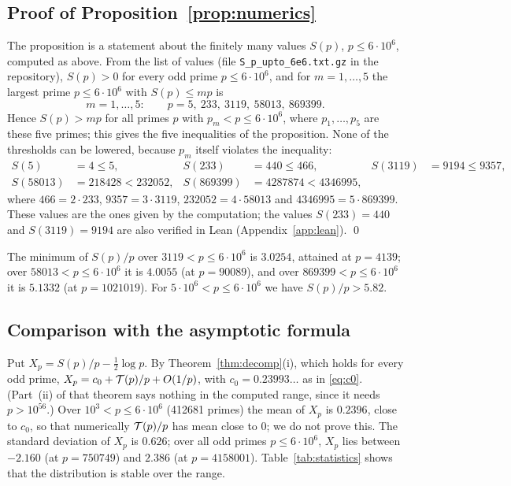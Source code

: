\subsection{Proof of Proposition~\ref{prop:numerics}}
The proposition is a statement about the finitely many values $S(p)$, $p\le6\cdot10^6$, computed as above. From the list of values (file \texttt{S\_p\_upto\_6e6.txt.gz} in the repository), $S(p)>0$ for every odd prime $p\le6\cdot10^6$, and for $m=1,\dots,5$ the largest prime $p\le6\cdot10^6$ with $S(p)\le mp$ is
\[
m=1,\dots,5:\qquad p=5,\ 233,\ 3119,\ 58013,\ 869399 .
\]
Hence $S(p)>mp$ for all primes $p$ with $p_m<p\le6\cdot10^6$, where $p_1,\dots,p_5$ are these five primes; this gives the five inequalities of the proposition. None of the thresholds can be lowered, because $p_m$ itself violates the inequality:
\[
\begin{aligned}
S(5)&=4\le5, & S(233)&=440\le466, & S(3119)&=9194\le9357,\\
S(58013)&=218428<232052, & S(869399)&=4287874<4346995,
\end{aligned}
\]
where $466=2\cdot233$, $9357=3\cdot3119$, $232052=4\cdot58013$ and $4346995=5\cdot869399$.
These values are the ones given by the computation; the values $S(233)=440$ and $S(3119)=9194$ are also verified in Lean (Appendix~\ref{app:lean}). \qed

The minimum of $S(p)/p$ over $3119<p\le6\cdot10^6$ is $3.0254$, attained at $p=4139$; over $58013<p\le6\cdot10^6$ it is $4.0055$ (at $p=90089$), and over $869399<p\le6\cdot10^6$ it is $5.1332$ (at $p=1021019$). For $5\cdot10^6<p\le6\cdot10^6$ we have $S(p)/p>5.82$.

\subsection{Comparison with the asymptotic formula}
Put $X_p=S(p)/p-\frac12\log p$. By Theorem~\ref{thm:decomp}(i), which holds for every odd prime, $X_p=c_0+\mathcal{T}(p)/p+O(1/p)$, with $c_0=0.23993\ldots$ as in \eqref{eq:c0}. (Part~(ii) of that theorem says nothing in the computed range, since it needs $p>10^{56}$.) Over $10^3<p\le6\cdot10^6$ (412681 primes) the mean of $X_p$ is $0.2396$, close to $c_0$, so that numerically $\mathcal{T}(p)/p$ has mean close to $0$; we do not prove this. The standard deviation of $X_p$ is $0.626$; over all odd primes $p\le6\cdot10^6$, $X_p$ lies between $-2.160$ (at $p=750749$) and $2.386$ (at $p=4158001$). Table~\ref{tab:statistics} shows that the distribution is stable over the range.

